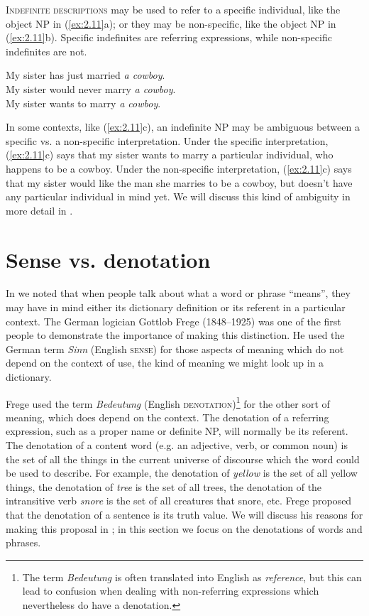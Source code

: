 \textsc{Indefinite descriptions} may be used to refer to a specific individual, like the object NP in (\ref{ex:2.11}a); or they may be non-specific, like the object NP in (\ref{ex:2.11}b). Specific indefinites are referring expressions, while non-specific indefinites are not.


\ea \label{ex:2.11}
\ea My sister has just married \textit{a cowboy}.\\
\ex My sister would never marry \textit{a cowboy}.\\
\ex My sister wants to marry \textit{a cowboy}.
                       \z
\z


In some contexts, like (\ref{ex:2.11}c), an indefinite NP may be ambiguous between a specific vs. a non-specific interpretation. Under the specific interpretation, (\ref{ex:2.11}c) says that my sister wants to marry a particular individual, who happens to be a cowboy. Under the non-specific interpretation, (\ref{ex:2.11}c) says that my sister would like the man she marries to be a cowboy, but doesn’t have any particular individual in mind yet. We will discuss this kind of ambiguity in more detail in .


\section{Sense vs. denotation}\label{sec:2.4}

In  we noted that when people talk about what a word or phrase “means”, they may have in mind either its dictionary definition or its referent in a particular context. The German logician Gottlob Frege (1848–1925) was one of the first people to demonstrate the importance of making this distinction. He used the German term \textit{Sinn} (English \textsc{sense}) for those aspects of meaning which do not depend on the context of use, the kind of meaning we might look up in a dictionary.



Frege used the term \textit{Bedeutung} (English \textsc{denotation})\footnote{The term \textit{Bedeutung} is often translated into English as \textit{reference}, but this can lead to confusion when dealing with non-referring expressions which nevertheless do have a denotation.} for the other sort of meaning, which does depend on the context. The denotation of a referring expression, such as a proper name or definite NP, will normally be its referent. The denotation of a content word (e.g. an adjective, verb, or common noun) is the set of all the things in the current universe of discourse which the word could be used to describe. For example, the denotation of \textit{yellow} is the set of all yellow things, the denotation of \textit{tree} is the set of all trees, the denotation of the intransitive verb \textit{snore} is the set of all creatures that snore, etc. Frege proposed that the denotation of a sentence is its truth value. We will discuss his reasons for making this proposal in ; in this section we focus on the denotations of words and phrases.



